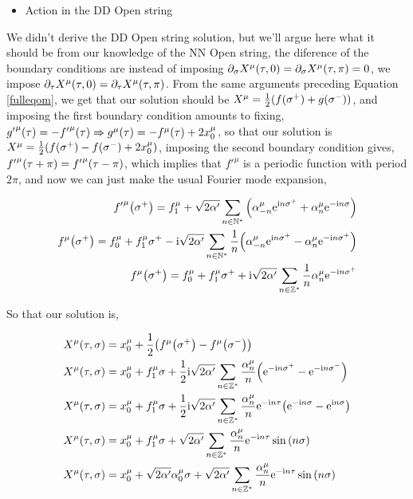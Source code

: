 \begin{itemize}
    \item Action in the DD Open string
\end{itemize}
We didn't derive the DD Open string solution, but we'll argue here what it should be from our knowledge of the NN Open string, the diference of 
the boundary conditions are instead of imposing $\partial_\sigma X^\mu\qty(\tau,0)=\partial_\sigma X^\mu\qty(\tau,\pi)=0$, we impose $\partial_\tau X^\mu\qty(\tau,0)=\partial_\tau X^\mu\qty(\tau,\pi)$. 
From the same arguments preceding Equation \ref{fulleqom}, we get that our solution should be $X^\mu=\frac12\qty(f\qty(\sigma^+)+g\qty(\sigma^-))$, and imposing the first
boundary condition amounts to fixing, ${g'}^\mu\qty(\tau)=-{f'}^\mu\qty(\tau)\Rightarrow g^\mu\qty(\tau)=-f^\mu\qty(\tau)+2x_0^\mu$, so that our solution is $X^\mu=\frac12\qty(f\qty(\sigma^+)-f\qty(\sigma^-)+2x_0^\mu)$, 
imposing the second boundary condition gives, ${f'}^\mu\qty(\tau+\pi)={f'}^\mu\qty(\tau-\pi)$, which implies that ${f'}^\mu$ is a periodic function with period $2\pi$, and now 
we can just make the usual Fourier mode expansion,

\begin{align*}
    {f'}^\mu\qty(\sigma^+)=f_1^\mu+\sqrt{2\alpha'}\sum\limits_{n\in\mathbb N^\ast}\qty(\alpha_{-n}^\mu\textnormal{e}^{\textnormal{i} n \sigma^+}+\alpha_n^\mu\textnormal{e}^{-\textnormal{i} n \sigma})\\
    f^\mu\qty(\sigma^+)=f_0^\mu+f_1^\mu\sigma^+-\textnormal{i}\sqrt{2\alpha'}\sum\limits_{n\in\mathbb N^\ast}\frac1n\qty(\alpha_{-n}^\mu\textnormal{e}^{\textnormal{i} n \sigma^+}-\alpha_n^\mu\textnormal{e}^{-\textnormal{i} n \sigma^+})\\
    f^\mu\qty(\sigma^+)=f_0^\mu+f_1^\mu\sigma^++\textnormal{i}\sqrt{2\alpha'}\sum\limits_{n\in\mathbb Z^\ast}\frac1n\alpha_n^\mu\textnormal{e}^{-\textnormal{i} n \sigma^+}
\end{align*}

So that our solution is,

\begin{align*}
    X^\mu\qty(\tau,\sigma)&=x_0^\mu+\frac12\qty(f^\mu\qty(\sigma^+)-f^\mu\qty(\sigma^-))\\
    X^\mu\qty(\tau,\sigma)&=x_0^\mu+f_1^\mu\sigma+\frac12\textnormal{i}\sqrt{2\alpha'}\sum\limits_{n\in\mathbb Z^\ast}\frac{\alpha_n^\mu}{n}\qty(\textnormal{e}^{-\textnormal{i} n \sigma^+}-\textnormal{e}^{-\textnormal{i} n \sigma^-})\\
    X^\mu\qty(\tau,\sigma)&=x_0^\mu+f_1^\mu\sigma+\frac12\textnormal{i}\sqrt{2\alpha'}\sum\limits_{n\in\mathbb Z^\ast}\frac{\alpha_n^\mu}{n}\textnormal{e}^{-\textnormal{i} n \tau}\qty(\textnormal{e}^{-\textnormal{i} n \sigma}-\textnormal{e}^{\textnormal{i} n \sigma})\\
    X^\mu\qty(\tau,\sigma)&=x_0^\mu+f_1^\mu\sigma+\sqrt{2\alpha'}\sum\limits_{n\in\mathbb Z^\ast}\frac{\alpha_n^\mu}{n}\textnormal{e}^{-\textnormal{i} n \tau}\sin\qty(n\sigma)\\
    X^\mu\qty(\tau,\sigma)&=x_0^\mu+\sqrt{2\alpha'}\alpha_0^\mu\sigma+\sqrt{2\alpha'}\sum\limits_{n\in\mathbb Z^\ast}\frac{\alpha_n^\mu}{n}\textnormal{e}^{-\textnormal{i} n \tau}\sin\qty(n\sigma)
\end{align*}

